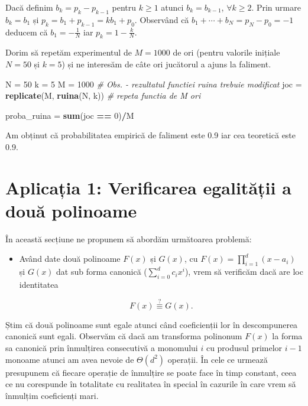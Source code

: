 \documentclass[]{article}
\newenvironment{Shaded}{\begin{snugshade}}{\end{snugshade}}
\newcommand{\KeywordTok}[1]{\textcolor[rgb]{0.13,0.29,0.53}{\textbf{#1}}}
\newcommand{\DecValTok}[1]{\textcolor[rgb]{0.00,0.00,0.81}{#1}}
\newcommand{\StringTok}[1]{\textcolor[rgb]{0.31,0.60,0.02}{#1}}
\newcommand{\CommentTok}[1]{\textcolor[rgb]{0.56,0.35,0.01}{\textit{#1}}}
\newcommand{\OperatorTok}[1]{\textcolor[rgb]{0.81,0.36,0.00}{\textbf{#1}}}
\newcommand{\NormalTok}[1]{#1}
\newenvironment{frshaded*}{%
  \def\FrameCommand{\fboxrule=\FrameRule\fboxsep=\FrameSep \fcolorbox{framecolor}{shadecolor1}}%
  \MakeFramed {\advance\hsize-\width \FrameRestore}}%
{\endMakeFramed}
\newenvironment{rmdblock}[1]
  {\begin{frshaded*}
  \begin{itemize}
  \renewcommand{\labelitemi}{
    \raisebox{-.7\height}[0pt][0pt]{
      {\setkeys{Gin}{width=2em,keepaspectratio}\texttt{[image: images/icons/\#1]}}
    }
  }
  \item
  }
  {
  \end{itemize}
  \end{frshaded*}
  }
\newenvironment{rmdexercise}
  {\begin{rmdblock}{exercise}}
  {\end{rmdblock}}
\begin{document}
Dacă definim \(b_k = p_k - p_{k-1}\) pentru \(k\geq 1\) atunci
\(b_k = b_{k-1}\), \(\forall k\geq2\). Prin urmare \(b_k = b_1\) și
\(p_k = b_1+p_{k-1} = kb_1+p_0\). Observând că
\(b_1+\cdots+b_N=p_N-p_0=-1\) deducem că \(b_1=-\frac{1}{N}\) iar
\(p_k=1-\frac{k}{N}\).

Dorim să repetăm experimentul de \(M = 1000\) de ori (pentru valorile
inițiale \(N = 50\) și \(k = 5\)) și ne interesăm de câte ori jucătorul
a ajuns la faliment.

\begin{Shaded}
\begin{Highlighting}[]
\NormalTok{N =}\StringTok{ }\DecValTok{50}
\NormalTok{k =}\StringTok{ }\DecValTok{5}
\NormalTok{M =}\StringTok{ }\DecValTok{1000}
\CommentTok{# Obs. - rezultatul functiei ruina trebuie modificat}
\NormalTok{joc =}\StringTok{ }\KeywordTok{replicate}\NormalTok{(M, }\KeywordTok{ruina}\NormalTok{(N, k)) }\CommentTok{# repeta functia de M ori }

\NormalTok{proba_ruina =}\StringTok{ }\KeywordTok{sum}\NormalTok{(joc }\OperatorTok{==}\StringTok{ }\DecValTok{0}\NormalTok{)}\OperatorTok{/}\NormalTok{M }
\end{Highlighting}
\end{Shaded}

Am obținut că probabilitatea empirică de faliment este 0.9 iar cea
teoretică este 0.9.

\section{Aplicația 1: Verificarea egalității a două
polinoame}\label{aplicatia-1-verificarea-egalitatii-a-doua-polinoame}

În această secțiune ne propunem să abordăm următoarea problemă:

\begin{rmdexercise}
Având date două polinoame \(F(x)\) și \(G(x)\), cu
\(F(x)=\prod_{i=1}^d(x-a_i)\) și \(G(x)\) dat sub forma canonică
(\(\sum_{i=0}^d c_ix^i\)), vrem să verificăm dacă are loc identitatea

\[
  F(x) \overset{?}{\equiv} G(x).
\]
\end{rmdexercise}

Știm că două polinoame sunt egale atunci când coeficienții lor în
descompunerea canonică sunt egali. Observăm că dacă am transforma
polinonum \(F(x)\) la forma sa canonică prin înmulțirea consecutivă a
monomului \(i\) cu produsul primelor \(i-1\) monoame atunci am avea
nevoie de \(\Theta(d^2)\) operații. În cele ce urmează presupunem că
fiecare operație de înmulțire se poate face în timp constant, ceea ce nu
corespunde în totalitate cu realitatea în special în cazurile în care
vrem să înmulțim coeficienți mari.
\end{document}
